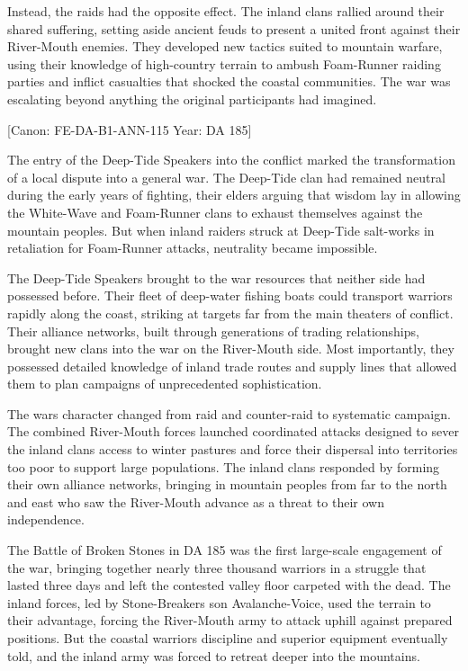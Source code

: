 Instead, the raids had the opposite effect. The inland clans rallied
around their shared suffering, setting aside ancient feuds to present a
united front against their River-Mouth enemies. They developed new
tactics suited to mountain warfare, using their knowledge of
high-country terrain to ambush Foam-Runner raiding parties and inflict
casualties that shocked the coastal communities. The war was escalating
beyond anything the original participants had imagined.

{[}Canon: FE-DA-B1-ANN-115 \textbar{} Year: DA 185{]}

The entry of the Deep-Tide Speakers into the conflict marked the
transformation of a local dispute into a general war. The Deep-Tide clan
had remained neutral during the early years of fighting, their elders
arguing that wisdom lay in allowing the White-Wave and Foam-Runner clans
to exhaust themselves against the mountain peoples. But when inland
raiders struck at Deep-Tide salt-works in retaliation for Foam-Runner
attacks, neutrality became impossible.

The Deep-Tide Speakers brought to the war resources that neither side
had possessed before. Their fleet of deep-water fishing boats could
transport warriors rapidly along the coast, striking at targets far from
the main theaters of conflict. Their alliance networks, built through
generations of trading relationships, brought new clans into the war on
the River-Mouth side. Most importantly, they possessed detailed
knowledge of inland trade routes and supply lines that allowed them to
plan campaigns of unprecedented sophistication.

The war\textquotesingle s character changed from raid and counter-raid
to systematic campaign. The combined River-Mouth forces launched
coordinated attacks designed to sever the inland clans\textquotesingle{}
access to winter pastures and force their dispersal into territories too
poor to support large populations. The inland clans responded by forming
their own alliance networks, bringing in mountain peoples from far to
the north and east who saw the River-Mouth advance as a threat to their
own independence.

The Battle of Broken Stones in DA 185 was the first large-scale
engagement of the war, bringing together nearly three thousand warriors
in a struggle that lasted three days and left the contested valley floor
carpeted with the dead. The inland forces, led by
Stone-Breaker\textquotesingle s son Avalanche-Voice, used the terrain to
their advantage, forcing the River-Mouth army to attack uphill against
prepared positions. But the coastal warriors\textquotesingle{}
discipline and superior equipment eventually told, and the inland army
was forced to retreat deeper into the mountains.

